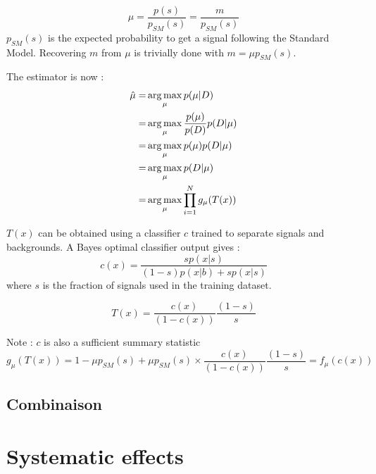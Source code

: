 \begin{equation}
	\mu = \frac{p(s)}{p_{SM}(s)} = \frac{m}{p_{SM}(s)}
\end{equation}
$p_{SM}(s)$ is the expected probability to get a signal following the Standard Model.
Recovering $m$ from $\mu$ is trivially done with $m = \mu p_{SM}(s)$.

The estimator is now :
\begin{align}
	\hat\mu =& \operatorname*{arg\,max}_\mu p(\mu | D) \\
	     =& \operatorname*{arg\,max}_\mu \frac{p(\mu)}{p(D)} p(D | \mu) \\
	     =& \operatorname*{arg\,max}_\mu p(\mu) p(D | \mu) \\
	     =& \operatorname*{arg\,max}_\mu  p(D | \mu) \\
	     =& \operatorname*{arg\,max}_\mu  \prod_{i=1}^N g_\mu(T(x)) \\
\end{align}


$T(x)$ can be obtained using a classifier $c$ trained to separate signals and backgrounds.
A Bayes optimal classifier output gives :
\begin{equation}
	c(x) = \frac{s p(x|s)}{(1-s) p(x|b) + s p(x|s)}
\end{equation}
where $s$ is the fraction of signals used in the training dataset.

\begin{equation}
	T(x) = \frac{c(x)}{(1-c(x))} \frac{(1-s)}{s} 
\end{equation}


Note : $c$ is also a sufficient summary statistic
\begin{equation}
	g_\mu(T(x)) = 1 - \mu p_{SM}(s) + \mu p_{SM}(s) \times \frac{c(x)}{(1-c(x))} \frac{(1-s)}{s} = f_\mu(c(x))
\end{equation}



\subsection{Combinaison} %
\label{sub:combinaison}





\section{Systematic effects} %
\label{sec:systematic_effects}


